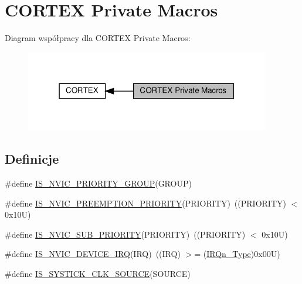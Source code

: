 \hypertarget{group___c_o_r_t_e_x___private___macros}{}\section{C\+O\+R\+T\+EX Private Macros}
\label{group___c_o_r_t_e_x___private___macros}
Diagram współpracy dla C\+O\+R\+T\+EX Private Macros\+:\nopagebreak
\begin{figure}[H]
\begin{center}
\leavevmode
\includegraphics[width=303pt]{group___c_o_r_t_e_x___private___macros}
\end{center}
\end{figure}
\subsection*{Definicje}
\begin{DoxyCompactItemize}
\item 
\#define \hyperlink{group___c_o_r_t_e_x___private___macros_ga6569304a39fe4f91bd59b6a586c8ede9}{I\+S\+\_\+\+N\+V\+I\+C\+\_\+\+P\+R\+I\+O\+R\+I\+T\+Y\+\_\+\+G\+R\+O\+UP}(G\+R\+O\+UP)
\item 
\#define \hyperlink{group___c_o_r_t_e_x___private___macros_gaf30fd8f5960c2e28a772d8f16bb156dd}{I\+S\+\_\+\+N\+V\+I\+C\+\_\+\+P\+R\+E\+E\+M\+P\+T\+I\+O\+N\+\_\+\+P\+R\+I\+O\+R\+I\+TY}(P\+R\+I\+O\+R\+I\+TY)~((P\+R\+I\+O\+R\+I\+TY) $<$ 0x10\+U)
\item 
\#define \hyperlink{group___c_o_r_t_e_x___private___macros_ga010705bc997dcff935b965b372cba61d}{I\+S\+\_\+\+N\+V\+I\+C\+\_\+\+S\+U\+B\+\_\+\+P\+R\+I\+O\+R\+I\+TY}(P\+R\+I\+O\+R\+I\+TY)~((P\+R\+I\+O\+R\+I\+TY) $<$ 0x10\+U)
\item 
\#define \hyperlink{group___c_o_r_t_e_x___private___macros_ga9b8dcac4ed8e88c14d9bb04e369dad6a}{I\+S\+\_\+\+N\+V\+I\+C\+\_\+\+D\+E\+V\+I\+C\+E\+\_\+\+I\+RQ}(I\+RQ)~((I\+RQ) $>$= (\hyperlink{group___peripheral__interrupt__number__definition_ga7e1129cd8a196f4284d41db3e82ad5c8}{I\+R\+Qn\+\_\+\+Type})0x00\+U)
\item 
\#define \hyperlink{group___c_o_r_t_e_x___private___macros_ga22d6291f6aed29442cf4cd9098fa0784}{I\+S\+\_\+\+S\+Y\+S\+T\+I\+C\+K\+\_\+\+C\+L\+K\+\_\+\+S\+O\+U\+R\+CE}(S\+O\+U\+R\+CE)
\end{DoxyCompactItemize}


